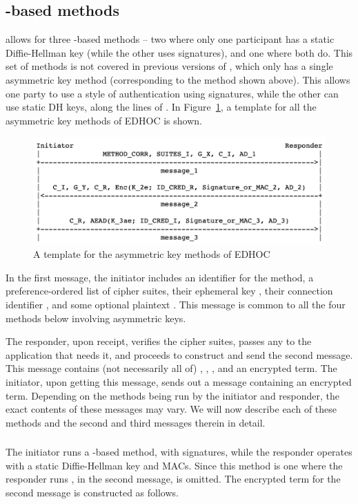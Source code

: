\subsection{\mStat-based methods}
\mEdhoc allows for three \mStat-based methods -- two where only one participant has a static Diffie-Hellman key (while the other uses signatures), and one where both do. This set of methods is not covered in previous versions of \mEdhoc, which only has a single \mSigma asymmetric key method (corresponding to the \mSigSig method shown above). This allows one party to use a \mSigma style of authentication using signatures, while the other can use static DH keys, along the lines of \mOptls. In Figure~\ref{fig:edhocasym}, a template for all the asymmetric key methods of EDHOC is shown. 

\begin{figure}[!h]\label{fig:edhocasym}
\centering
\includegraphics[scale=0.3]{Images/asym.png}
\caption{A template for the asymmetric key methods of EDHOC}
\end{figure}

In the first message, the initiator includes an identifier for the method, a preference-ordered list of cipher suites, their ephemeral key \mGx, their connection identifier \mCi, and some optional plaintext \mADone. This message is common to all the four methods below involving asymmetric keys. 

The responder, upon receipt, verifies the cipher suites, passes any \mADone to the application that needs it, and proceeds to construct and send the second message. This message contains (not necessarily all of) \mCi, \mGy, \mCr, and an encrypted term. The initiator, upon getting this message, sends out a message containing an encrypted term. Depending on the methods being run by the initiator and responder, the exact contents of these messages may vary. We will now describe each of these methods and the second and third messages therein in detail.

\subsubsection{\mSigStat}
The initiator runs a \mSigma-based method, with signatures, while the responder operates with a static Diffie-Hellman key and MACs. Since this method is one where the responder runs \mStat, in the second message, \mCi is omitted. The encrypted term for the second message is constructed as follows. 

